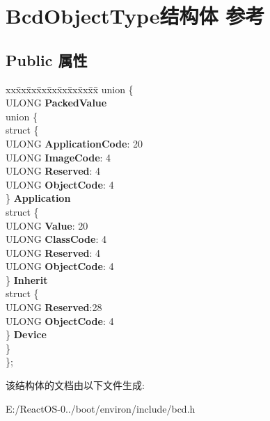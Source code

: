 \hypertarget{struct_bcd_object_type}{}\section{Bcd\+Object\+Type结构体 参考}
\label{struct_bcd_object_type}
\subsection*{Public 属性}
\begin{DoxyCompactItemize}
\item 
\mbox{\label{struct_bcd_object_type_a716905a7be26da4f73afe2fee44588fe}} 
\begin{tabbing}
xx\=xx\=xx\=xx\=xx\=xx\=xx\=xx\=xx\=\kill
union \{\\
\>ULONG {\bfseries PackedValue}\\
\mbox{\label{union_bcd_object_type_1_1_0D98_a1beb8a6d9f685ac871749c4dd8b6f138}} 
\>union \{\\
\>\>struct \{\\
\>\>\>ULONG {\bfseries ApplicationCode}: 20\\
\>\>\>ULONG {\bfseries ImageCode}: 4\\
\>\>\>ULONG {\bfseries Reserved}: 4\\
\>\>\>ULONG {\bfseries ObjectCode}: 4\\
\>\>\} {\bfseries Application}\\
\>\>struct \{\\
\>\>\>ULONG {\bfseries Value}: 20\\
\>\>\>ULONG {\bfseries ClassCode}: 4\\
\>\>\>ULONG {\bfseries Reserved}: 4\\
\>\>\>ULONG {\bfseries ObjectCode}: 4\\
\>\>\} {\bfseries Inherit}\\
\>\>struct \{\\
\>\>\>ULONG {\bfseries Reserved}:28\\
\>\>\>ULONG {\bfseries ObjectCode}: 4\\
\>\>\} {\bfseries Device}\\
\>\} \\
\}; \\

\end{tabbing}\end{DoxyCompactItemize}


该结构体的文档由以下文件生成\+:\begin{DoxyCompactItemize}
\item 
E\+:/\+React\+O\+S-\/0../boot/environ/include/bcd.\+h\end{DoxyCompactItemize}
